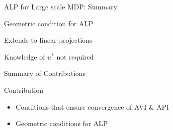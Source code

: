 \documentclass[10pt]{beamer}
\begin{document}
\begin{frame}[fragile]{ALP for Large scale MDP: Summary}


\begin{block}{\Large Geometric condition for ALP}\end{block}
\vspace{10pt}
\begin{block}{\Large Extends to linear projections}\end{block}
\vspace{10pt}
\begin{block}{\Large Knowledge of $u^*$ not required}\end{block}



\end{frame}

\begin{frame}[fragile]{Summary of Contributions}
\begin{algorithm}[H]
\caption*{Template of Approximate DP Algorithm}
\begin{algorithmic}[1]
\STATE{\}}
\end{algorithmic}
\end{algorithm}
\begin{block}{Contribution}
\begin{itemize}
\item Conditions that ensure convergence of AVI \& API
\item Geometric conditions for ALP
\end{itemize}
\end{block}

\end{frame}
\end{document}
